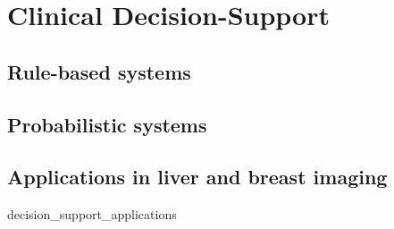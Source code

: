 \chapter{Clinical Decision-Support}

\section{Rule-based systems}

\section{Probabilistic systems}

\section{Applications in liver and breast imaging}
{decision_support_applications}





